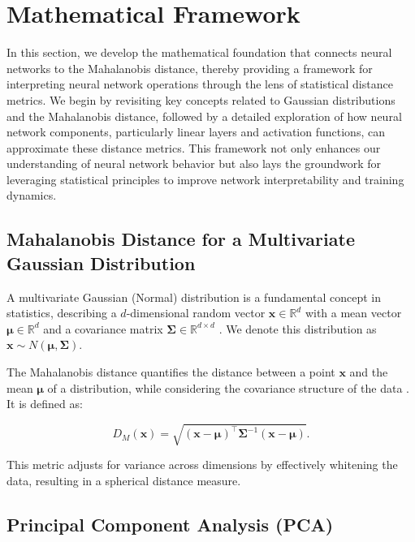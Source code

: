 
\section{Mathematical Framework}
\label{sec:math_framework}

In this section, we develop the mathematical foundation that connects neural networks to the Mahalanobis distance, thereby providing a framework for interpreting neural network operations through the lens of statistical distance metrics. We begin by revisiting key concepts related to Gaussian distributions and the Mahalanobis distance, followed by a detailed exploration of how neural network components, particularly linear layers and activation functions, can approximate these distance metrics. This framework not only enhances our understanding of neural network behavior but also lays the groundwork for leveraging statistical principles to improve network interpretability and training dynamics.

\subsection{Mahalanobis Distance for a Multivariate Gaussian Distribution}

A multivariate Gaussian (Normal) distribution is a fundamental concept in statistics, describing a \(d\)-dimensional random vector \(\mathbf{x} \in \mathbb{R}^d\) with a mean vector \(\boldsymbol{\mu} \in \mathbb{R}^d\) and a covariance matrix \(\boldsymbol{\Sigma} \in \mathbb{R}^{d \times d}\) \citep{bishop2006pattern}. We denote this distribution as \(\mathbf{x} \sim N(\boldsymbol{\mu}, \boldsymbol{\Sigma})\).

The Mahalanobis distance quantifies the distance between a point \(\mathbf{x}\) and the mean \(\boldsymbol{\mu}\) of a distribution, while considering the covariance structure of the data \citep{mahalanobis1936generalized, demaesschalck2000mahalanobis}. It is defined as:

\begin{equation}
\label{eq:mahalanobis_distance}
D_M(\mathbf{x}) = \sqrt{ (\mathbf{x} - \boldsymbol{\mu})^\top \boldsymbol{\Sigma}^{-1} (\mathbf{x} - \boldsymbol{\mu}) }.
\end{equation}

This metric adjusts for variance across dimensions by effectively whitening the data, resulting in a spherical distance measure.

\subsection{Principal Component Analysis (PCA)}

